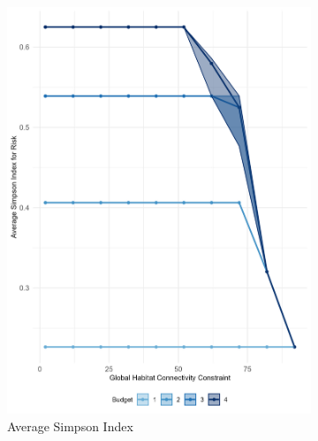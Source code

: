 \begin{figure}
    \centering
    \begin{subfigure}[b]{.48\textwidth}
        \centering
        \includegraphics[height = .3\textheight]{figures/wildland/average_simpson.jpg}
        \caption{Average Simpson Index}
        \label{fig:simpson}
    \end{subfigure}
    \hfill
    \begin{subfigure}[b]{.48\textwidth}
        \centering

\end{subfigure}
\end{figure}
